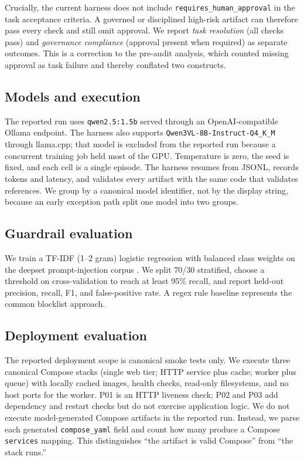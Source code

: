 \documentclass[11pt]{article}
\begin{document}
Crucially, the current harness does not include \texttt{requires\_human\_approval} in the task acceptance criteria. A governed or disciplined high-risk artifact can therefore pass every check and still omit approval. We report \emph{task resolution} (all checks pass) and \emph{governance compliance} (approval present when required) as separate outcomes. This is a correction to the pre-audit analysis, which counted missing approval as task failure and thereby conflated two constructs.

\subsection{Models and execution}
The reported run uses \texttt{qwen2.5:1.5b} served through an OpenAI-compatible Ollama endpoint. The harness also supports \texttt{Qwen3VL-8B-Instruct-Q4\_K\_M} through llama.cpp; that model is excluded from the reported run because a concurrent training job held most of the GPU. Temperature is zero, the seed is fixed, and each cell is a single episode. The harness resumes from JSONL, records tokens and latency, and validates every artifact with the same code that validates references. We group by a canonical model identifier, not by the display string, because an early exception path split one model into two groups.

\subsection{Guardrail evaluation}
We train a TF-IDF (1--2 gram) logistic regression with balanced class weights on the deepset prompt-injection corpus \citep{deepset2023}. We split 70/30 stratified, choose a threshold on cross-validation to reach at least 95\% recall, and report held-out precision, recall, F1, and false-positive rate. A regex rule baseline represents the common blocklist approach.

\subsection{Deployment evaluation}
The reported deployment scope is canonical smoke tests only. We execute three canonical Compose stacks (single web tier; HTTP service plus cache; worker plus queue) with locally cached images, health checks, read-only filesystems, and no host ports for the worker. P01 is an HTTP liveness check; P02 and P03 add dependency and restart checks but do not exercise application logic. We do not execute model-generated Compose artifacts in the reported run. Instead, we parse each generated \texttt{compose\_yaml} field and count how many produce a Compose \texttt{services} mapping. This distinguishes ``the artifact is valid Compose'' from ``the stack runs.''
\end{document}
